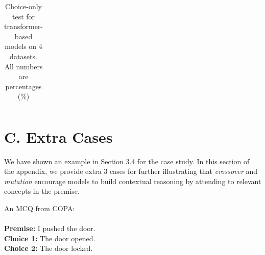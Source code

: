 \documentclass[runningheads]{llncs}
\newcommand{\secref}[1]{Section \ref{#1}}
\newcommand{\KZ}[1]{\textcolor{blue}{Kenny: #1}}
\newcommand{\crosssymbol}{{\color{red} \XSolidBrush} }
\newcommand{\checksymbol}{{\color{green} \Checkmark} }
\begin{document}
\begin{table}[th]
\begin{tabular}{c|rrrr}
\bottomrule
\end{tabular}
\caption{Choice-only test for transformer-based models on 4 datasets. All numbers are percentages (\%)}
\label{tab:only-test}
\end{table}

\section{C.   Extra Cases}
We have shown an example in Section 3.4 
for the case study. In this section of the appendix, we 
provide extra 3 cases for further illustrating that \textit{crossover} and \textit{mutation} 
encourage models to build contextual reasoning  
by attending to relevant concepts in the premise. 

\begin{example}\label{ex:copa1}
An MCQ from COPA:\\ \\
\noindent
\textbf{Premise:} I pushed the door. \\
\textbf{Choice 1:} The door opened.  \checksymbol  \\
\textbf{Choice 2:} The door locked. \crosssymbol
\end{example}
\end{document}
